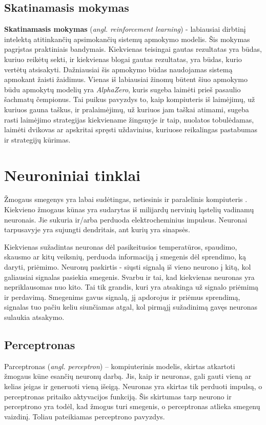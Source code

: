 \documentclass{VUMIFPSbakalaurinis}
\begin{document}
\subsection{Skatinamasis mokymas}
\textbf{Skatinamasis mokymas} (\textit{angl. reinforcement learning}) - labiausiai dirbtinį intelektą atitinkančių apsimokančių sistemų apmokymo modelis. Šis mokymas pagrįstas praktiniais bandymais. Kiekvienas teisingai gautas rezultatas yra būdas, kuriuo reikėtų sekti, ir kiekvienas blogai gautas rezultatas, yra būdas, kurio vertėtų atsisakyti. Dažniausiai šis apmokymo būdas naudojamas sistemą apmokant žaisti žaidimus. Vienas iš labiausiai žinomų būtent šiuo apmokymo būdu apmokytų modelių yra \textit{AlphaZero}, kuris sugeba laimėti prieš pasaulio šachmatų čempionus. Tai puikus pavyzdys to, kaip kompiuteris iš laimėjimų, už kuriuos gauna taškus, ir pralaimėjimų, už kuriuos jam taškai atimami, sugeba rasti laimėjimo strategijas kiekviename žingsnyje ir taip, nuolatos tobulėdamas, laimėti dvikovas ar apskritai spręsti uždavinius, kuriuose reikalingas pastabumas ir strategijų kūrimas.


\section{Neuroniniai tinklai}
Žmogaus smegenys yra labai sudėtingas, netiesinis ir paralelinis kompiuteris \cite{Hay09}. Kiekvieno žmogaus kūnas yra sudarytas iš milijardų nervinių ląstelių vadinamų neuronais. Jie sukuria ir/arba perduoda elektrocheminius impulsus. Neuronai tarpusavyje yra sujungti dendritais, ant kurių yra sinapsės. 

Kiekvienas sužadintas neuronas dėl pasikeitusios temperatūros, spaudimo, skausmo ar kitų veiksnių, perduoda informaciją į smegenis dėl sprendimo, ką daryti, priėmimo. Neuronų paskirtis - siųsti signalą iš vieno neurono į kitą, kol galiausiai signalas pasiekia smegenis. Svarbu ir tai, kad kiekvienas neuronas yra nepriklausomas nuo kito. Tai tik grandis, kuri yra atsakinga už signalo priėmimą ir perdavimą. Smegenims gavus signalą, jį apdorojus ir priėmus sprendimą, signalas tuo pačiu keliu siunčiamas atgal, kol pirmąjį sužadinimą gavęs neuronas sulaukia atsakymo. 

\subsection{Perceptronas}

Parceptronas (\textit{angl. perceptron}) – kompiuterinis modelis, skirtas atkartoti žmogaus kūne esančių neuronų darbą. Jis, kaip ir neuronas, gali gauti vieną ar kelias įeigas ir generuoti vieną išeigą. Neuronas yra skirtas tik perduoti impulsą, o perceptronas pritaiko aktyvacijos funkciją. Šis skirtumas tarp neurono ir perceptrono yra todėl, kad žmogus turi smegenis, o perceptronas atlieka smegenų vaizdinį. Toliau pateikiamas perceptrono pavyzdys.
\end{document}
